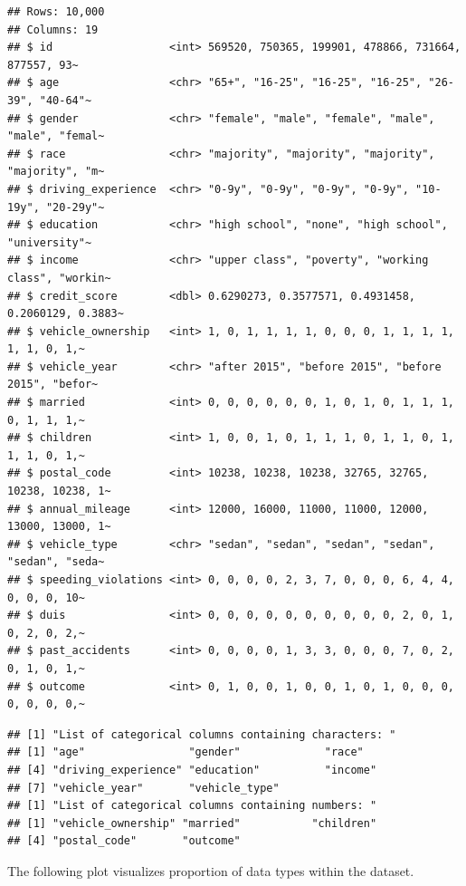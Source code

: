 \documentclass{article}
\begin{document}
\begin{verbatim}
## Rows: 10,000
## Columns: 19
## $ id                  <int> 569520, 750365, 199901, 478866, 731664, 877557, 93~
## $ age                 <chr> "65+", "16-25", "16-25", "16-25", "26-39", "40-64"~
## $ gender              <chr> "female", "male", "female", "male", "male", "femal~
## $ race                <chr> "majority", "majority", "majority", "majority", "m~
## $ driving_experience  <chr> "0-9y", "0-9y", "0-9y", "0-9y", "10-19y", "20-29y"~
## $ education           <chr> "high school", "none", "high school", "university"~
## $ income              <chr> "upper class", "poverty", "working class", "workin~
## $ credit_score        <dbl> 0.6290273, 0.3577571, 0.4931458, 0.2060129, 0.3883~
## $ vehicle_ownership   <int> 1, 0, 1, 1, 1, 1, 0, 0, 0, 1, 1, 1, 1, 1, 1, 0, 1,~
## $ vehicle_year        <chr> "after 2015", "before 2015", "before 2015", "befor~
## $ married             <int> 0, 0, 0, 0, 0, 0, 1, 0, 1, 0, 1, 1, 1, 0, 1, 1, 1,~
## $ children            <int> 1, 0, 0, 1, 0, 1, 1, 1, 0, 1, 1, 0, 1, 1, 1, 0, 1,~
## $ postal_code         <int> 10238, 10238, 10238, 32765, 32765, 10238, 10238, 1~
## $ annual_mileage      <int> 12000, 16000, 11000, 11000, 12000, 13000, 13000, 1~
## $ vehicle_type        <chr> "sedan", "sedan", "sedan", "sedan", "sedan", "seda~
## $ speeding_violations <int> 0, 0, 0, 0, 2, 3, 7, 0, 0, 0, 6, 4, 4, 0, 0, 0, 10~
## $ duis                <int> 0, 0, 0, 0, 0, 0, 0, 0, 0, 0, 2, 0, 1, 0, 2, 0, 2,~
## $ past_accidents      <int> 0, 0, 0, 0, 1, 3, 3, 0, 0, 0, 7, 0, 2, 0, 1, 0, 1,~
## $ outcome             <int> 0, 1, 0, 0, 1, 0, 0, 1, 0, 1, 0, 0, 0, 0, 0, 0, 0,~
\end{verbatim}

\normalsize

\scriptsize

\begin{verbatim}
## [1] "List of categorical columns containing characters: "
## [1] "age"                "gender"             "race"              
## [4] "driving_experience" "education"          "income"            
## [7] "vehicle_year"       "vehicle_type"      
## [1] "List of categorical columns containing numbers: "
## [1] "vehicle_ownership" "married"           "children"         
## [4] "postal_code"       "outcome"
\end{verbatim}

The following plot visualizes proportion of data types within the
dataset.
\end{document}
